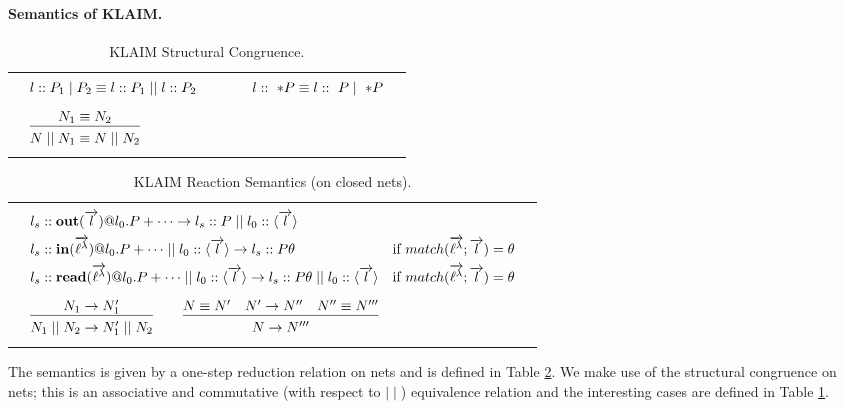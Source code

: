 \documentclass[a4paper]{llncs}
\makeatletter
\newcommand{\netpar}{\mid\mid}
\newcommand{\ppar}{\mid}
\newcommand{\YZl}{l}
\newcommand{\Lat}{\ell^\lambda}
\newcommand{\veck}[1]{\overrightarrow{#1}}
\newcommand{\Inference}[2]{\begin{array}{@{}c@{}}#1\\[0em]\hline\\[-0.9em]#2\\
\end{array}}
\newenvironment{ARRAY}[1]{%
  \begin{tabular*}{\textwidth}{@{\extracolsep{\fill}}c@{}c@{}c}
  \hline
  &&\\[-5pt]
  &\begin{math}\begin{array}{@{} #1 @{}}
}
{ \end{array}\end{math}&\\
  &&\\[-5pt]
  \hline
  \end{tabular*}
}
\makeatother
\begin{document}
\paragraph{Semantics of KLAIM.}\label{klaim:semantics}

\begin{table}[t]
\begin{ARRAY}{l@{\qquad\qquad}l}
l:: P_1 \ppar P_2 \equiv l::P_1 \netpar l::P_2 &
l ::\ * P  \equiv l ::\ P \ppar\ * P
\\[2ex]
\Inference{N_1 \equiv N_2}{N \netpar N_1 \equiv N \netpar N_2}
\end{ARRAY}
\caption{KLAIM Structural Congruence.}
\label{klaim:sem_structural_congruence}
\end{table}

\begin{table}[t]
\begin{ARRAY}{ll}
l_s::\mathbf{out}(\veck\YZl)@l_0.P+\cdots \rightarrow
l_s::P \netpar l_0::\langle \veck\YZl \rangle
\\[1ex]
l_s::\mathbf{in}(\veck\Lat)@l_0.P+ \cdots \netpar
l_0::\langle \veck\YZl \rangle \rightarrow l_s::P
\theta & \hbox{if $match(\veck\Lat;\veck\YZl)= \theta$}
\\[1ex]
l_s::\mathbf{read}(\veck\Lat)@l_0.P+ \cdots \netpar
l_0::\langle \veck\YZl \rangle \rightarrow  l_s::P
\theta \netpar l_0::\langle \veck\YZl \rangle & 
\hbox{if $match(\veck\Lat;\veck\YZl)= \theta$}
\\[2ex]
\Inference{ N_1 \rightarrow N_1'}{ N_1 \netpar
N_2 \rightarrow  N_1' \netpar N_2}
\hfill
\Inference{N \equiv N'\quad  N' \rightarrow N'' \quad N'' \equiv
N'''}{ N \rightarrow N'''}
\end{ARRAY}
\caption{KLAIM Reaction Semantics (on closed nets).}
\label{klaim:sem}
\end{table}

The semantics is given by a one-step reduction relation on nets and is
defined in Table \ref{klaim:sem}.  We make use of the structural
congruence on nets; this is an associative and commutative (with
respect to $\netpar$) equivalence relation and the interesting cases
are defined in Table \ref{klaim:sem_structural_congruence}.
\end{document}
